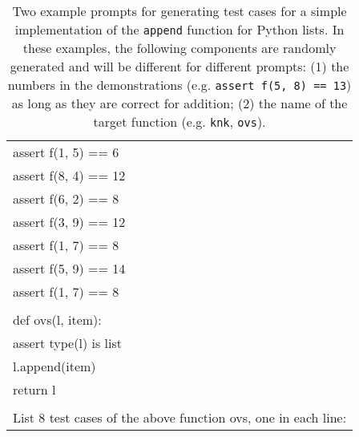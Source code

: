 \begin{table}[h!]
\begin{tabular}{l}
assert f(1, 5) == 6 \\
assert f(8, 4) == 12 \\
assert f(6, 2) == 8 \\
assert f(3, 9) == 12 \\
assert f(1, 7) == 8 \\
assert f(5, 9) == 14 \\
assert f(1, 7) == 8 \\
 \\
def ovs(l, item): \\
\quad \quad   assert type(l) is list \\
\quad \quad   l.append(item) \\
\quad \quad   return l \\
 \\
List 8 test cases of the above function ovs, one in each line: \\
\bottomrule
\end{tabular} 
\caption{
Two example prompts for generating test cases for a simple implementation of the \texttt{append} function for Python lists.
In these examples, the following components are randomly generated and will be different for different prompts:
(1) the numbers in the demonstrations 
(e.g. \texttt{assert f(5, 8) == 13})
as long as they are correct for addition;
(2) the name of the target function
(e.g. \texttt{knk}, \texttt{ovs}).
}
\label{table:prompt_example}
\end{table}


